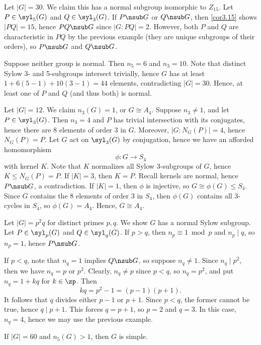 \ex Let $|G| = 30$. We claim this has a normal subgroup isomorphic to $Z_{15}$. Let $P \in \syl_5(G)$ and $Q \in \syl_3(G)$. If $P \nsub G$ or $Q \nsub G$, then \autoref{cor3.15} shows $|PQ| = 15$, hence $PQ \nsub G$ since $|G : PQ| = 2$. However, both $P$ and $Q$ are characteristic in $PQ$ by the previous example (they are unique subgroups of their orders), so $P \nsub G$ and $Q \nsub G$.

Suppose neither group is normal. Then $n_5 = 6$ and $n_3 = 10$. Note that distinct Sylow 3- and 5-subgroups intersect trivially, hence $G$ has at least $1 + 6(5 - 1) + 10(3 - 1) = 44$ elements, contradicting $|G| = 30$. Hence, at least one of $P$ and $Q$ (and thus both) is normal.

\ex Let $|G| = 12$. We claim $n_3(G) = 1$, or $G \cong A_4$. Suppose $n_3 \neq 1$, and let $P \in \syl_3(G)$. Then $n_3 = 4$ and $P$ has trivial intersection with its conjugates, hence there are 8 elements of order 3 in $G$. Moreover, $|G : N_G(P)| = 4$, hence $N_G(P) = P$. Let $G$ act on $\syl_3(G)$ by conjugation, hence we have an afforded homomorphism
\[\phi : G \to S_4\]
with kernel $K$. Note that $K$ normalizes all Sylow 3-subgroups of $G$, hence $K \leq N_G(P) = P$. If $|K| = 3$, then $K = P$. Recall kernels are normal, hence $P \nsub G$, a contradiction. If $|K| = 1$, then $\phi$ is injective, so $G \cong \phi(G) \leq S_4$. Since $G$ contains the 8 elements of order 3 in $S_4$, then $\phi(G)$ contains all 3-cycles in $S_4$, so $\phi(G) = A_4$. Hence, $G \cong A_4$.

\ex Let $|G| = p^2q$ for distinct primes $p, q$. We show $G$ has a normal Sylow subgroup. Let $P \in \syl_p(G)$ and $Q \in \syl_q(G)$. If $p > q$, then $n_p \equiv 1 \bmod p$ and $n_p \mid q$, so $n_p = 1$, hence $P \nsub G$.

If $p < q$, note that $n_q = 1$ implies $Q \nsub G$, so suppose $n_q \neq 1$. Since $n_q \mid p^2$, then we have $n_q = p$ or $p^2$. Clearly, $n_q \neq p$ since $p < q$, so $n_q = p^2$, and put $n_q = 1 + kq$ for $k \in \zp$. Then
\[kq = p^2 - 1 = (p - 1)(p + 1).\]
It follows that $q$ divides either $p - 1$ or $p + 1$. Since $p < q$, the former cannot be true, hence $q \mid p + 1$. This forces $q = p + 1$, so $p = 2$ and $q = 3$. In this case, $n_q = 4$, hence we may use the previous example.

 \label{prop4.21}
If $|G| = 60$ and $n_5(G) > 1$, then $G$ is simple.

